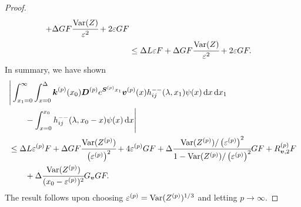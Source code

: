 \begin{proof}
\begin{align}
		+\Delta GF \cfrac{\mathrm{Var}(Z)}{\varepsilon^2} + 2\varepsilon GF
		\\&\leq \Delta L\varepsilon   F 
		+\Delta GF \cfrac{\mathrm{Var}(Z)}{\varepsilon^2} + 2\varepsilon GF.\label{eqn: LLLaase}
	\end{align}
	In summary, we have shown 
	\begin{align}
		&\Bigg|\int_{x_1=0}^\infty \int_{x=0}^{\Delta}\boldsymbol k^{(p)}(x_0) \boldsymbol D^{(p)} e^{\boldsymbol S^{(p)} x_1} {\boldsymbol v}^{(p)}(x) h_{ij}^{--}(\lambda, x_1) \psi(x) \, \mathrm{d} x \, \mathrm{d} x_1 \nonumber
		\\&\qquad{}- \int_{x=0}^{x_0} h_{ij}^{--}(\lambda,x_0-x)\psi(x)\, \mathrm{d} x \Bigg| \nonumber 
		\\& \leq  \Delta L\varepsilon^{(p)}   F 
		+\Delta GF \cfrac{\mathrm{Var}(Z^{(p)})}{\left(\varepsilon^{(p)}\right)^2} + 4\varepsilon^{(p)} GF + \Delta \cfrac{\mathrm{Var}(Z^{(p)})/\left(\varepsilon^{(p)}\right)^2}{1-\mathrm{Var}(Z^{(p)})/\left(\varepsilon^{(p)}\right)^2}GF + R_{{\boldsymbol v},2}^{(p)} F \nonumber
		\\&\qquad{} +  \Delta \cfrac{\mathrm{Var}(Z^{(p)})}{(x_0-\varepsilon^{(p)})^2} G_{\boldsymbol v} G F.
	\end{align}
	The result follows upon choosing \(\varepsilon^{(p)}=\mathrm{Var}(Z^{(p)})^{1/3}\) and letting \(p\to\infty\). 
\end{proof}

